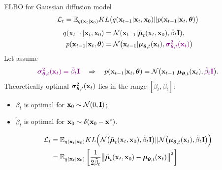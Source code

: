 \begin{frame}{ELBO for Gaussian diffusion model}
	\vspace{-0.3cm}
	\[
		\mathcal{L}_t = \mathbb{E}_{q(\mathbf{x}_t | \mathbf{x}_0)} KL \bigl(q(\mathbf{x}_{t-1} | \mathbf{x}_t, \mathbf{x}_0) || p(\mathbf{x}_{t - 1} | \mathbf{x}_t, \boldsymbol{\theta} )\bigr)
	\]
	\vspace{-0.4cm}
	\begin{align*}
		q(\mathbf{x}_{t-1} | \mathbf{x}_t, \mathbf{x}_0) &= \mathcal{N}(\mathbf{x}_{t-1} | \tilde{\boldsymbol{\mu}}_t(\mathbf{x}_t, \mathbf{x}_0), \tilde{\beta}_t \mathbf{I}), \\
		p(\mathbf{x}_{t - 1} | \mathbf{x}_t, \boldsymbol{\theta}) &= \mathcal{N} \bigl(\mathbf{x}_{t - 1} | \boldsymbol{\mu}_{\boldsymbol{\theta}, t}(\mathbf{x}_t), {\color{violet}\boldsymbol{\sigma}_{\boldsymbol{\theta}, t}^2(\mathbf{x}_t)}\bigr)
	\end{align*}
	Let assume
	\[
		{\color{violet}\boldsymbol{\sigma}_{\boldsymbol{\theta}, t}^2(\mathbf{x}_t) = \tilde{\beta}_t \mathbf{I}} \quad \Rightarrow \quad p(\mathbf{x}_{t - 1} | \mathbf{x}_t, \boldsymbol{\theta}) = \mathcal{N} \bigl(\mathbf{x}_{t - 1} | \boldsymbol{\mu}_{\boldsymbol{\theta}, t}(\mathbf{x}_t), {\color{violet}\tilde{\beta}_t \mathbf{I}} \bigr).
	\]
	Theoretically optimal $\boldsymbol{\sigma}_{\boldsymbol{\theta}, t}^2(\mathbf{x}_t)$ lies in the range $[\tilde{\beta}_t, \beta_t]$:
	\begin{itemize}
		\item $\beta_t$ is optimal for $\mathbf{x}_0 \sim \mathcal{N}(0, \mathbf{I})$;
		\item $\tilde{\beta}_t$ is optimal for $\mathbf{x}_0 \sim \delta(\mathbf{x}_0 - \mathbf{x}^*)$.
	\end{itemize}
	\begin{align*}
		\mathcal{L}_t &= \mathbb{E}_{q(\mathbf{x}_t | \mathbf{x}_0)} KL\Bigl(\mathcal{N}\bigl(\tilde{\boldsymbol{\mu}}_t(\mathbf{x}_t, \mathbf{x}_0), \tilde{\beta}_t \mathbf{I} \bigr) || \mathcal{N}\bigl(\boldsymbol{\mu}_{\boldsymbol{\theta}, t}(\mathbf{x}_t), \tilde{\beta}_t \mathbf{I}\bigr)\Bigr) \\ 
		&= \mathbb{E}_{q(\mathbf{x}_t | \mathbf{x}_0)} \left[\frac{1}{2\tilde{\beta}_t} \bigl\| \tilde{\boldsymbol{\mu}}_t(\mathbf{x}_t, \mathbf{x}_0) - \boldsymbol{\mu}_{\boldsymbol{\theta}, t}(\mathbf{x}_t) \bigr\|^2  \right]
	\end{align*}
	
\end{frame}
